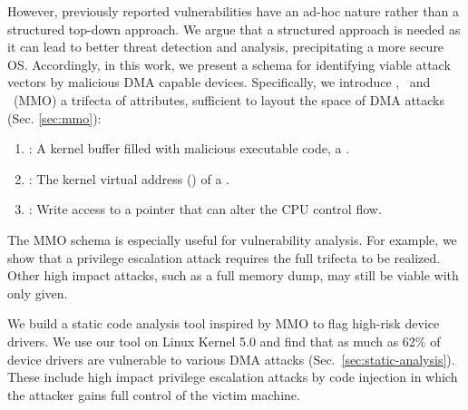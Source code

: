 However, previously reported vulnerabilities have an ad-hoc nature \cite{thunder,MMT16,Ben17b} rather than a structured top-down approach. We argue that a structured approach is needed as it can lead to better threat detection and analysis, precipitating a more secure OS.
Accordingly, in this work, we present a schema for identifying viable attack vectors by malicious DMA capable devices. Specifically, we introduce \means,~\motivation{} and \oportunity~(MMO) a trifecta of attributes, sufficient to layout the space of DMA attacks (Sec. \ref{sec:mmo}):
\begin{enumerate}
    \item \motivation: A kernel buffer filled with malicious executable code, a \mabaf.
    \item \means: The kernel virtual address (\kva) of a \mabaf.
    \item \oportunity: Write access to a pointer that can alter the CPU control flow.
\end{enumerate} 

The MMO schema is especially useful for vulnerability analysis. For example, we show that a privilege escalation attack requires the full trifecta to be realized. Other high impact attacks, such as a full memory dump, may still be viable with only \oportunity{} given. 



We build a static code analysis tool inspired by MMO to flag high-risk device drivers. 
We use our tool on Linux Kernel 5.0 and find that as much as 62\% of device drivers are vulnerable to various DMA attacks (Sec.~\ref{sec:static-analysis}). 
These include high impact privilege escalation attacks by code injection in which the attacker gains full control of the victim machine.

